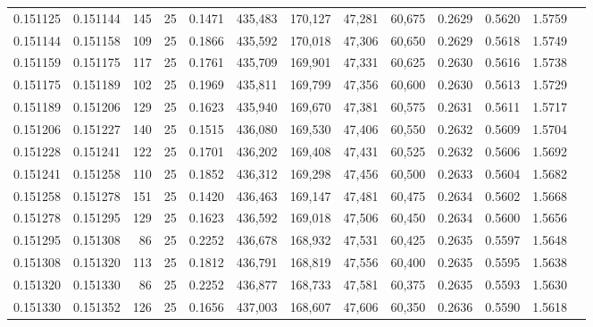 \begin{tabular}{rrrrrrrrrrrrr}
0.151125 & 0.151144 &   145 &  25 &                                     0.1471 & 435,483 & 170,127 &  47,281 &  60,675 & 0.2629 & 0.5620 & 1.5759 \\
0.151144 & 0.151158 &   109 &  25 &                                     0.1866 & 435,592 & 170,018 &  47,306 &  60,650 & 0.2629 & 0.5618 & 1.5749 \\
0.151159 & 0.151175 &   117 &  25 &                                     0.1761 & 435,709 & 169,901 &  47,331 &  60,625 & 0.2630 & 0.5616 & 1.5738 \\
0.151175 & 0.151189 &   102 &  25 &                                     0.1969 & 435,811 & 169,799 &  47,356 &  60,600 & 0.2630 & 0.5613 & 1.5729 \\
0.151189 & 0.151206 &   129 &  25 &                                     0.1623 & 435,940 & 169,670 &  47,381 &  60,575 & 0.2631 & 0.5611 & 1.5717 \\
0.151206 & 0.151227 &   140 &  25 &                                     0.1515 & 436,080 & 169,530 &  47,406 &  60,550 & 0.2632 & 0.5609 & 1.5704 \\
0.151228 & 0.151241 &   122 &  25 &                                     0.1701 & 436,202 & 169,408 &  47,431 &  60,525 & 0.2632 & 0.5606 & 1.5692 \\
0.151241 & 0.151258 &   110 &  25 &                                     0.1852 & 436,312 & 169,298 &  47,456 &  60,500 & 0.2633 & 0.5604 & 1.5682 \\
0.151258 & 0.151278 &   151 &  25 &                                     0.1420 & 436,463 & 169,147 &  47,481 &  60,475 & 0.2634 & 0.5602 & 1.5668 \\
0.151278 & 0.151295 &   129 &  25 &                                     0.1623 & 436,592 & 169,018 &  47,506 &  60,450 & 0.2634 & 0.5600 & 1.5656 \\
0.151295 & 0.151308 &    86 &  25 &                                     0.2252 & 436,678 & 168,932 &  47,531 &  60,425 & 0.2635 & 0.5597 & 1.5648 \\
0.151308 & 0.151320 &   113 &  25 &                                     0.1812 & 436,791 & 168,819 &  47,556 &  60,400 & 0.2635 & 0.5595 & 1.5638 \\
0.151320 & 0.151330 &    86 &  25 &                                     0.2252 & 436,877 & 168,733 &  47,581 &  60,375 & 0.2635 & 0.5593 & 1.5630 \\
0.151330 & 0.151352 &   126 &  25 &                                     0.1656 & 437,003 & 168,607 &  47,606 &  60,350 & 0.2636 & 0.5590 & 1.5618 \\

\end{tabular}
